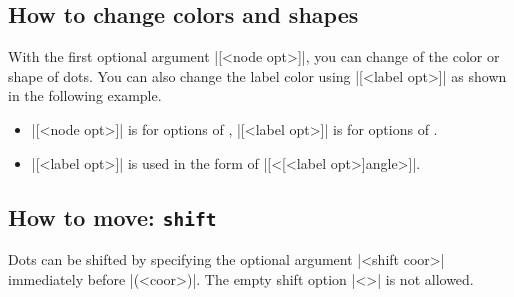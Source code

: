\subsection{How to change colors and shapes}
\label{ss:tzdot:color}

With the first optional argument |[<node opt>]|, you can change of the color or shape of dots.
You can also change the label color using |[<label opt>]| as shown in the following example.

\remark 
\begin{itemize}\firmlist
\item |[<node opt>]| is for options of , |[<label opt>]| is for options of .
\item |[<label opt>]| is used in the form of |[<[<label opt>]angle>]|.
\end{itemize}

\begin{tzcode}{.3}
\end{tzcode}


\begin{tzcode}{.3}
\end{tzcode}



\subsection{How to move: \texttt{shift}}
\label{ss:tzdot:shift}

Dots can be shifted by specifying the optional argument |<shift coor>| immediately before |(<coor>)|. The empty shift option |<>| is not allowed.

\begin{tzcode}{.3}
\end{tzcode}


